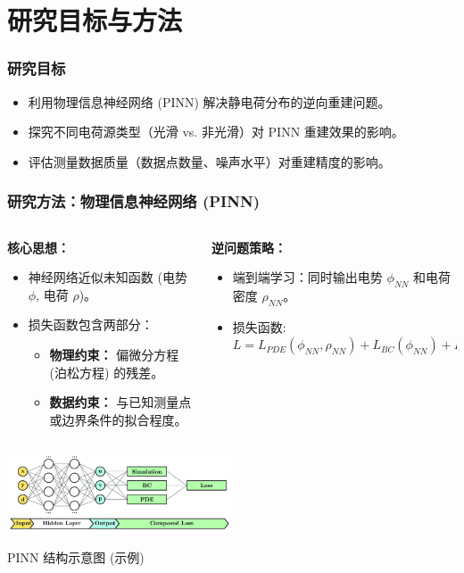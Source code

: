 \documentclass[aspectratio=169]{ctexbeamer}
\begin{document}
\section{研究目标与方法}
\begin{frame}
  \frametitle{研究目标}
    \begin{itemize}
        \item 利用物理信息神经网络 (PINN) 解决静电荷分布的逆向重建问题。
        \item 探究不同电荷源类型（光滑 vs. 非光滑）对 PINN 重建效果的影响。
        \item 评估测量数据质量（数据点数量、噪声水平）对重建精度的影响。
    \end{itemize}
\end{frame}
\begin{frame}
	\frametitle{研究方法：物理信息神经网络 (PINN)}
		\begin{columns}[T]
				\begin{column}{0.5\textwidth}
						\textbf{核心思想：}
						\begin{itemize}
								\item 神经网络近似未知函数 (电势 $\phi$, 电荷 $\rho$)。
								\item 损失函数包含两部分：
										\begin{itemize}
												\item \textbf{物理约束：} 偏微分方程 (泊松方程) 的残差。
												\item \textbf{数据约束：} 与已知测量点或边界条件的拟合程度。
										\end{itemize}
						\end{itemize}
				\end{column}
				\begin{column}{0.5\textwidth}
						\textbf{逆问题策略：}
						\begin{itemize}
								\item 端到端学习：同时输出电势 $\phi_{NN}$ 和电荷密度 $\rho_{NN}$。
								\item 损失函数: $L = L_{PDE}(\phi_{NN}, \rho_{NN}) + L_{BC}(\phi_{NN}) + L_{Data}(\phi_{NN}, \phi_{measured})$
						\end{itemize}
				\end{column}
		\end{columns}
		\vspace{1em}
		\begin{center}
				\includegraphics[width=0.5\textwidth]{figures/pinn_schematic.png}

				\small PINN 结构示意图 (示例)
		\end{center}
\end{frame}
\end{document}
